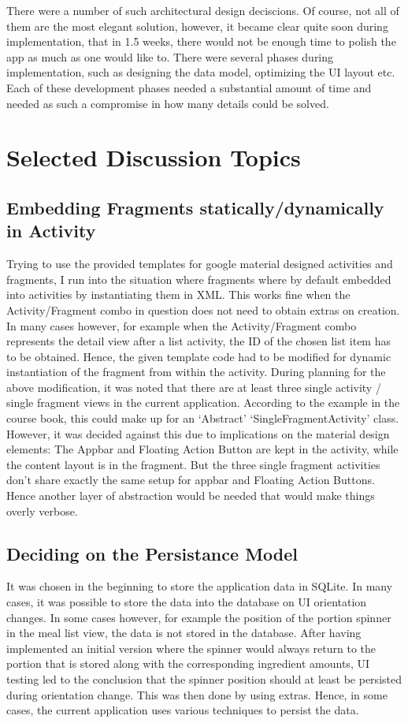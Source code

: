 \documentclass[a4paper,11pt,twoside]{article}
\begin{document}
There were a number of such architectural design deciscions. Of course, not all
of them are the most elegant solution, however, it became clear quite soon during
implementation, that in 1.5 weeks, there would not be enough time to polish the
app as much as one would like to. There were several phases during implementation,
such as designing the data model, optimizing the UI layout etc. Each of these
development phases needed a substantial amount of time and needed as such
a compromise in how many details could be solved.

\section{Selected Discussion Topics}

\subsection{Embedding Fragments statically/dynamically in Activity}
Trying to use the provided templates for google material designed activities and
fragments, I run into the situation where fragments where by default embedded into
activities by instantiating them in XML. This works fine when the Activity/Fragment
combo in question does not need to obtain extras on creation. In many cases however,
for example when the Activity/Fragment combo represents the detail view after a
list activity, the ID of the chosen list item has to be obtained. Hence, the given
template code had to be modified for dynamic instantiation of the fragment from
within the activity.
During planning for the above modification, it was noted that there are at least
three single activity / single fragment views in the current application. According
to the example in the course book, this could make up for an `Abstract'
`SingleFragmentActivity' class. However, it was decided against this due to
implications on the material design elements: The Appbar and Floating Action Button
are kept in the activity, while the content layout is in the fragment. But the
three single fragment activities don't share exactly the same setup for appbar
and Floating Action Buttons. Hence another layer of abstraction would be needed that
would make things overly verbose.

\subsection{Deciding on the Persistance Model} It was chosen in the beginning to
store the application data in SQLite. In many cases, it was possible to store
the data into the database on UI orientation changes. In some cases however, for
example the position of the portion spinner in the meal list view, the data is
not stored in the database. After having implemented an initial version where
the spinner would always return to the portion that is stored along with the
corresponding ingredient amounts, UI testing led to the conclusion that the spinner
position should at least be persisted during orientation change. This was then
done by using extras. Hence, in some cases, the current application uses various
techniques to persist the data.
\end{document}
